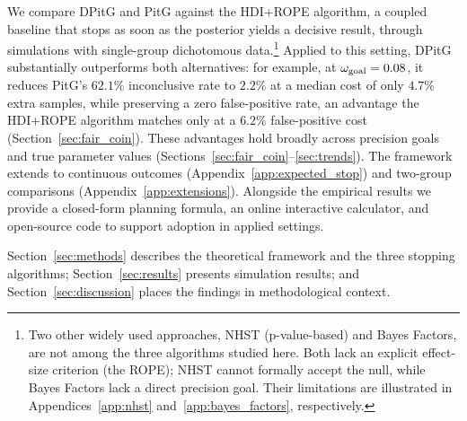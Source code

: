We compare DPitG and PitG against the HDI+ROPE algorithm, a coupled baseline that stops as
soon as the posterior yields a decisive result, through simulations with
single-group dichotomous data.\footnote{Two other widely used approaches, NHST
(p-value-based) and Bayes Factors, are not among the three algorithms studied
here. Both lack an explicit effect-size criterion (the ROPE); NHST cannot formally
accept the null, while Bayes Factors lack a direct precision goal.
Their limitations are illustrated in Appendices~\ref{app:nhst}
and~\ref{app:bayes_factors}, respectively.}
Applied to this setting, DPitG substantially outperforms both alternatives: for
example, at $\omega_{\rm goal}=0.08$, it reduces PitG's $62.1\%$ inconclusive rate
to $2.2\%$ at a median cost of only $4.7\%$ extra samples, while preserving a zero
false-positive rate, an advantage the HDI+ROPE algorithm matches only at a $6.2\%$
false-positive cost (Section~\ref{sec:fair_coin}). These advantages hold broadly
across precision goals and true parameter values
(Sections~\ref{sec:fair_coin}--\ref{sec:trends}).
The framework extends to continuous outcomes
(Appendix~\ref{app:expected_stop}) and two-group comparisons
(Appendix~\ref{app:extensions}).
Alongside the empirical results we provide a closed-form planning formula, an online
interactive calculator, and open-source code to support adoption in applied settings.

Section~\ref{sec:methods} describes the theoretical framework and the three stopping
algorithms; Section~\ref{sec:results} presents simulation results; and
Section~\ref{sec:discussion} places the findings in methodological context.
